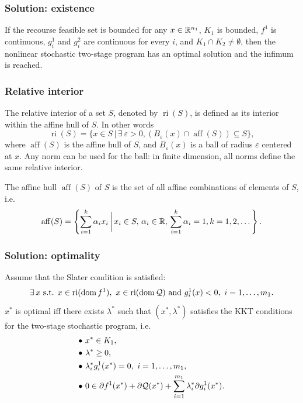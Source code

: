 \documentclass[aspectratio=169]{beamer}
\def\aff{\operatorname{aff}}
\begin{document}
\begin{frame}
\frametitle{Solution: existence}

\begin{theorem}
	If the recourse feasible set is bounded for any $x \in {\mathbb{R}}^{n_1}$, $K_1$ is bounded, $f^1$ is continuous, $g_i^1$ and $g_i^2$ are continuous for every $i$, and $K_1 \cap K_2 \ne \emptyset$,
	then the nonlinear stochastic two-stage program has an optimal solution and the infimum is reached.
\end{theorem}

\end{frame}

\begin{frame}
	\frametitle{Relative interior}
	
	The {\red relative interior} of a set $S$, denoted by $\operatorname{ri}(S)$, is defined as its interior within the affine hull of $S$.
	In other words
	\[
	\operatorname{ri}(S) = \lbrace x \in S \,|\, \exists\ \varepsilon > 0, (B_{\varepsilon}(x)
	\cap \aff(S)) \subseteq S \rbrace,
	\]
	where $\aff(S)$ is the {\red affine hull} of $S$, and $B_{\varepsilon}(x)$
	is a ball of radius ${\varepsilon}$ centered at $x$.
	Any norm can be used for the ball: in finite dimension, all norms define the same relative interior.
	
	\mbox{}
	
	The {\red affine hull} $\aff(S)$ of $S$ is the set of all affine combinations of elements of $S$, i.e.
	\[
	\operatorname{aff} (S)=\left\lbrace \sum_{i=1}^k \alpha_i x_i \,\bigg|\,
	x_i\in S, \, \alpha_i\in {\mathbb{R}}, \, \sum_{i=1}^k \alpha_i=1,
	k=1, 2, \dots\right\rbrace. 
	\]
\end{frame}

\begin{frame}
\frametitle{Solution: optimality}

\begin{theorem}
Assume that the Slater condition is satisfied:
$$
 \exists\, x \text{ s.t. } x \in \operatorname{ri}(\mbox{dom}\, f^1),\ x \in \operatorname{ri}(\mbox{dom}\, {\mathcal{Q}}) \text{ and } g_i^1(x) < 0,\ i = 1,\ldots,m_1.
$$
$x^*$ is optimal iff there exists $\lambda^*$ such that $(x^*, \lambda^*)$ satisfies the KKT conditions for the two-stage stochastic program, i.e.
\begin{align*}
\bullet\ & x^* \in K_1, \\
\bullet\ & \lambda^* \geq 0, \\ 
\bullet\ & \lambda_i^*g_i^1(x^*) = 0,\ i = 1,\ldots,m_1, \\
\bullet\ & 0 \in \partial f^1(x^*) + \partial {\mathcal{Q}}(x^*) +
 \sum_{i=1}^{m_1}\lambda_i^* \partial g_i^1(x^*).
\end{align*}
\end{theorem}

\end{frame}
\end{document}
